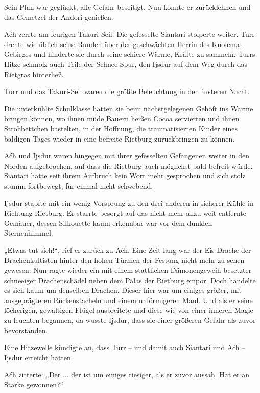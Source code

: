 Sein Plan war geglückt, alle Gefahr beseitigt. Nun konnte er zurücklehnen und das Gemetzel der Andori genießen.



\trennzeichen



Aćh zerrte am feurigen Takuri-Seil. Die gefesselte Siantari stolperte weiter. Turr drehte wie üblich seine Runden über der geschwächten Herrin des Kuolema-Gebirges und hinderte sie durch seine schiere Wärme, Kräfte zu sammeln. Turrs Hitze schmolz auch Teile der Schnee-Spur, den Ijsdur auf dem Weg durch das Rietgras hinterließ.

Turr und das Takuri-Seil waren die größte Beleuchtung in der finsteren Nacht.

Die unterkühlte Schulklasse hatten sie beim nächstgelegenen Gehöft ins Warme bringen können, wo ihnen müde Bauern heißen Cocoa servierten und ihnen Strohbettchen bastelten, in der Hoffnung, die traumatisierten Kinder eines baldigen Tages wieder in eine befreite Rietburg zurückbringen zu können.

Aćh und Ijsdur waren hingegen mit ihrer gefesselten Gefangenen weiter in den Norden aufgebrochen, auf dass die Rietburg auch möglichst bald befreit würde. Siantari hatte seit ihrem Aufbruch kein Wort mehr gesprochen und sich stolz stumm fortbewegt, für einmal nicht schwebend.

Ijsdur stapfte mit ein wenig Vorsprung zu den drei anderen in sicherer Kühle in Richtung Rietburg. Er starrte besorgt auf das nicht mehr allzu weit entfernte Gemäuer, dessen Silhouette kaum erkennbar war vor dem dunklen Sternenhimmel.

„Etwas tut sich!“, rief er zurück zu Aćh. Eine Zeit lang war der Eis-Drache der Drachenkultisten hinter den hohen Türmen der Festung nicht mehr zu sehen gewesen. Nun ragte wieder ein mit einem stattlichen Dämonengeweih besetzter schneeiger Drachenschädel neben dem Palas der Rietburg empor. Doch handelte es sich kaum um denselben Drachen. Dieser hier war um einiges größer, mit ausgeprägteren Rückenstacheln und einem unförmigeren Maul. Und als er seine löcherigen, gewaltigen Flügel ausbreitete und diese wie von einer inneren Magie zu leuchten begannen, da wusste Ijsdur, dass sie einer größeren Gefahr als zuvor bevorstanden.

Eine Hitzewelle kündigte an, dass Turr – und damit auch Siantari und Aćh – Ijsdur erreicht hatten.

Aćh zitterte: „Der ... der ist um einiges riesiger, als er zuvor aussah. Hat er an Stärke gewonnen?“

